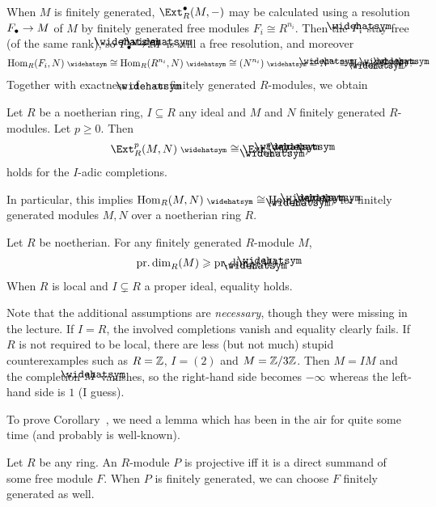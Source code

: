 \documentclass[a4paper,parskip=half,numbers=enddot, DIV=12]{scrreprt}
\renewcommand{\geq}{\geqslant}
\begin{document}
When $M$ is finitely generated, $\Ext_R^\bullet(M,-)$ may be calculated using a resolution $F_\bullet \morphism M$ of $M$ by finitely generated free modules $F_i\cong R^{n_i}$. Then the $\roof{F}_i$ stay free (of the same rank), so $\roof{F}_\bullet\morphism \roof{M}$ is still a free resolution, and moreover
\begin{align*}
	\Hom_R(F_i,N)^\complete \cong \Hom_R(R^{n_i},N)^\complete \cong (N^{n_i})^\complete \cong \roof{N}^{n_i}\cong \Hom_{\roof{R}}(\roof{F_i},\roof{N})\;.
\end{align*}
Together with exactness of $\roof{\phantom{x}}$ on finitely generated $R$-modules, we obtain
\begin{prop}
	Let $R$ be a noetherian ring, $I\subseteq R$ any ideal and $M$ and $N$ finitely generated $R$-modules. Let $p\geq 0$. Then
	\begin{align*}
		\Ext_R^p(M,N)^\complete \cong \Ext_{\roof{R}}^p(\roof{M},\roof{N})
	\end{align*}
	holds for the $I$-adic completions.
\end{prop}
In particular, this implies $\Hom_R(M,N)^\complete \cong\Hom_{\roof{R}}(\roof{M},\roof{N})$ for finitely generated modules $M,N$ over a noetherian ring $R$.
\begin{cor}
	Let $R$ be noetherian. For any finitely generated $R$-module $M$, 
	\begin{align*}		
		\pdim_R(M)\geq\pdim_{\roof{R}}(\roof{M})\;.
	\end{align*}
	When $R$ is local and $I\subsetneq R$ a proper ideal, equality holds.
\end{cor}
\begin{rem*}
	Note that the additional assumptions are \emph{necessary}, though they were missing in the lecture. If $I=R$, the involved completions vanish and equality clearly fails. If $R$ is not required to be local, there are less (but not much) stupid counterexamples such as $R=\mathbb{Z}$, $I=(2)$ and $M=\mathbb{Z}/3\mathbb{Z}$. Then $M=IM$ and the completion $\roof{M}$ vanishes, so the right-hand side becomes $-\infty$ whereas the left-hand side is $1$ (I guess).
\end{rem*}
To prove Corollary~, we need a lemma which has been in the air for quite some time (and probably is well-known).
\begin{lem}
	Let $R$ be any ring. An $R$-module $P$ is projective iff it is a direct summand of some free module $F$. When $P$ is finitely generated, we can choose $F$ finitely generated as well.
\end{lem}
\end{document}
